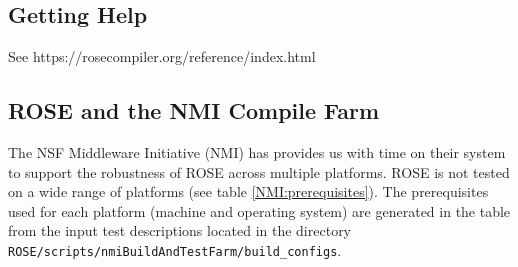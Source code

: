 \subsection{Getting Help}

%

See https://rosecompiler.org/reference/index.html


\subsection{ROSE and the NMI Compile Farm}
\label{NMI_testing}

   The NSF Middleware Initiative (NMI) has provides us with 
time on their system to support the robustness of ROSE across
multiple platforms.  ROSE is not tested on a wide range of platforms
(see table \ref{NMI:prerequisites}).  The prerequisites
used for each platform (machine and operating system) are generated
in the table from the input test descriptions located in the 
directory {\tt ROSE/scripts/nmiBuildAndTestFarm/build\_configs}.

